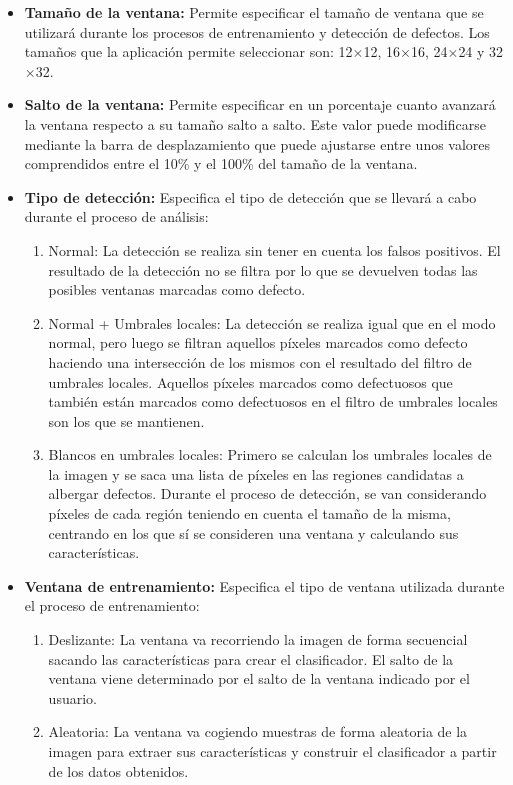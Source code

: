 \begin{itemize}
\item \textbf{Tamaño de la ventana:} Permite especificar el tamaño de ventana que se utilizará durante los procesos de entrenamiento y detección de defectos. Los tamaños que la aplicación permite seleccionar son: 12$\times$12, 16$\times$16, 24$\times$24 y 32$\times$32.

\item \textbf{Salto de la ventana:} Permite especificar en un porcentaje cuanto avanzará la ventana respecto a su tamaño salto a salto. Este valor puede modificarse mediante la barra de desplazamiento que puede ajustarse entre unos valores comprendidos entre el 10\% y el 100\% del tamaño de la ventana.

\item \textbf{Tipo de detección:} Especifica el tipo de detección que se llevará a cabo durante el proceso de análisis:

\begin{enumerate}
\item Normal: La detección se realiza sin tener en cuenta los falsos positivos. El resultado de la detección no se filtra por lo que se devuelven todas las posibles ventanas marcadas como defecto.
\item Normal + Umbrales locales: La detección se realiza igual que en el modo normal, pero luego se filtran aquellos píxeles marcados como defecto haciendo una intersección de los mismos con el resultado del filtro de umbrales locales. Aquellos píxeles marcados como defectuosos que también están marcados como defectuosos en el filtro de umbrales locales son los que se mantienen.
\item Blancos en umbrales locales: Primero se calculan los umbrales locales de la imagen y se saca una lista de píxeles en las regiones candidatas a albergar defectos. Durante el proceso de detección, se van considerando píxeles de cada región teniendo en cuenta el tamaño de la misma, centrando en los que sí se consideren una ventana y calculando sus características.
\end{enumerate}

\item \textbf{Ventana de entrenamiento:} Especifica el tipo de ventana utilizada durante el proceso de entrenamiento:

\begin{enumerate}
\item Deslizante: La ventana va recorriendo la imagen de forma secuencial sacando las características para crear el clasificador. El salto de la ventana viene determinado por el salto de la ventana indicado por el usuario.
\item Aleatoria: La ventana va cogiendo muestras de forma aleatoria de la imagen para extraer sus características y construir el clasificador a partir de los datos obtenidos.
\end{enumerate}



\end{itemize}
